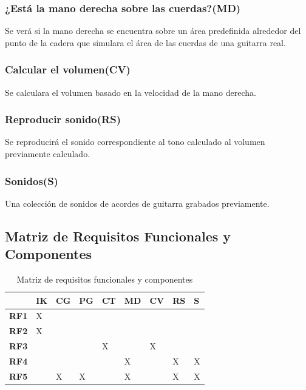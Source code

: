 \documentclass[a4paper,12pt]{article}
\begin{document}
\subsubsection{¿Está la mano derecha sobre las cuerdas?(MD)}
Se verá si la mano derecha se encuentra sobre un área predefinida alrededor del punto de la cadera que simulara el área de las cuerdas de una guitarra real.
\subsubsection{Calcular el volumen(CV)}
Se calculara el volumen basado en la velocidad de la mano derecha.
\subsubsection{Reproducir sonido(RS)}
Se reproducirá el sonido correspondiente al tono calculado al volumen previamente calculado.
\subsubsection{Sonidos(S)}
Una colección de sonidos de acordes de guitarra grabados previamente.
\subsection{Matriz de Requisitos Funcionales y Componentes}
\begin{table}[h!]
        \centering
        \begin{tabular}{|p{2cm}|p{2cm}|p{2cm}|p{2cm}|p{2cm}|p{2cm}|p{2cm}|p{2cm}|}
                \hline
                 & \textbf{IK} & \textbf{CG} & \textbf{PG} & \textbf{CT} & \textbf{MD} & \textbf{CV} & \textbf{RS} & \textbf{S} \\
                \hline
                \textbf{RF1} & X & & & & & & & \\
                \hline
                \textbf{RF2} & X & & & & & & & \\
                \hline
                \textbf{RF3} & & & & X & & X & & \\
                \hline
                \textbf{RF4} & & & & & X & & X & X \\
                \hline
                \textbf{RF5} & & X & X & & X & & X & X \\
                \hline
        \end{tabular}
        \caption{Matriz de requisitos funcionales y componentes}
        \label{tab:matrizrequisitos}
\end{table}
\end{document}
